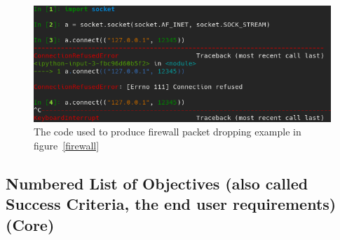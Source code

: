 \documentclass[titlepage]{article}
\let\Oldsubsection\subsection{}
\renewcommand{\subsection}{\FloatBarrier\Oldsubsection}
\begin{document}
\begin{figure}[H]
  \centering
  \includegraphics[width=\textwidth]{screenshots/packet_drop_code.png}
  \caption{%
    The code used to produce firewall packet dropping example in figure~\ref{firewall}
  }\label{firewall_code}
\end{figure}

\subsection{Numbered List of Objectives (also called Success Criteria, the end user requirements) (Core)}
\end{document}
